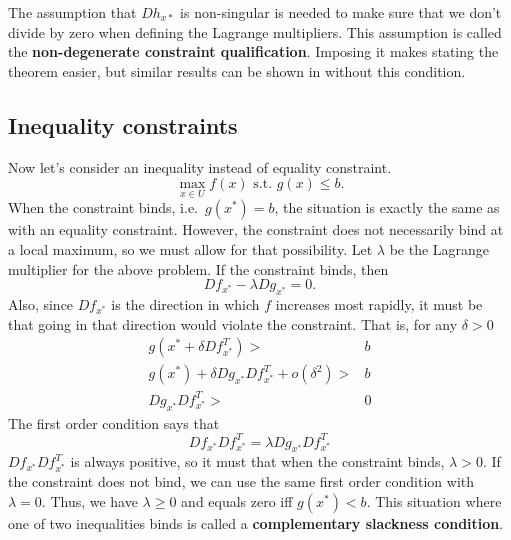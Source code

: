 \documentclass[12pt,reqno]{amsart}
\theoremstyle{definition}
\begin{document}
The assumption that $Dh_{x*}$ is non-singular is needed to make sure
that we don't divide by zero when defining the Lagrange
multipliers. This assumption is called the \textbf{non-degenerate
  constraint qualification}. Imposing it makes stating the theorem
easier, but similar results can be shown in without this condition. 

\subsection{Inequality constraints}

Now let's consider an inequality instead of equality constraint. 
\[ \max_{x \in U} f(x) \text{ s.t. } g(x) \leq b. \] When the
constraint binds, i.e.\ $g(x^*) = b$, the situation is exactly the
same as with an equality constraint. However, the constraint does not
necessarily bind at a local maximum, so we must allow for that
possibility.  Let $\lambda$ be the Lagrange multiplier for the above
problem. If the constraint binds, then
\[ Df_{x^*} - \lambda D g_{x^*} = 0. \] Also, since $Df_{x^*}$ is the
direction in which $f$ increases most rapidly, it must be that going
in that direction would violate the constraint. That is, for any
$\delta > 0$
\begin{align*} 
  g(x^* + \delta Df_{x^*}^T) > & b \\
  g(x^*) + \delta Dg_{x^*} Df_{x^*}^T + o(\delta^2) > & b \\
  Dg_{x^*} Df_{x^*}^T > & 0
\end{align*}
The first order condition says that
\[ Df_{x^*} Df_{x^*}^T =  \lambda D g_{x^*} D f_{x^*}^T \]
$Df_{x^*} Df_{x^*}^T$ is always positive, so it must that when the
constraint binds, $\lambda > 0$. If the constraint does not bind, we
can use the same first order condition with $\lambda=0$. Thus, we have
$\lambda \geq 0$ and equals zero iff $g(x^*) < b$. This situation
where one of two inequalities binds is called a \textbf{complementary
  slackness condition}. 
\end{document}
